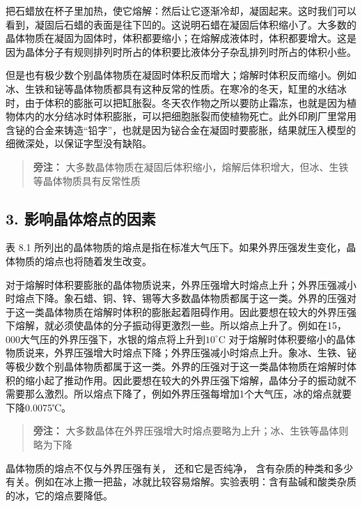 把石蜡放在杯子里加热，使它熔解：然后让它逐渐冷却，凝固起来。这时我们可以看到，凝固后石蜡的表面是往下凹的。这说明石蜡在凝固后体积缩小了。大多数的晶体物质在凝固为固体时，体积都要缩小；在熔解成液体时，体积都要增大。这是因为晶体分子有规则排列时所占的体积要比液体分子杂乱排列时所占的体积小些。

但是也有极少数个别晶体物质在凝固时体积反而增大；熔解时体积反而缩小。例如冰、生铁和铋等晶体物质都具有这种反常的性质。在寒冷的冬天，缸里的水结冰时，由于体积的膨胀可以把缸胀裂。冬天农作物之所以要防止霜冻，也就是因为植物体内的水分结冰时体积膨胀，可以把细胞胀裂而使植物死亡。此外印刷厂里常用含铋的合金来铸造``铅字''，也就是因为铋合金在凝固时要膨胀，结果就压入模型的细微深处，以保证字型没有缺陷。

\begin{quote}
\textbf{旁注：}
大多数晶体物质在凝固后体积缩小，熔解后体积增大，但冰、生铁等晶体物质具有反常性质
\end{quote}

\subsection{3.
影响晶体熔点的因素}\label{ux5f71ux54cdux6676ux4f53ux7194ux70b9ux7684ux56e0ux7d20}

表 8.1
所列出的晶体物质的熔点是指在标准大气压下。如果外界压强发生变化，晶体物质的熔点也将随着发生改变。

对于熔解时体积要膨胀的晶体物质说来，外界压强增大时熔点上升；外界压强减小时熔点下降。象石蜡、铜、锌、锡等大多数晶体物质都属于这一类。外界的压强对于这一类晶体物质在熔解时体积的膨胀起着阻碍作用。因此要想在较大的外界压强下熔解，就必须使晶体的分子振动得更激烈一些。所以熔点上升了。例如在15，000大气压的外界压强下，水银的熔点将上升到\(10^{\circ}\mathrm{C}\)
对于熔解时体积要缩小的晶体物质说来，外界压强增大时熔点下降；外界压强减小时熔点上升。象冰、生铁、铋等极少数个别晶体物质都属于这一类。外界的压强对于这一类晶体物质在熔解时体积的缩小起了推动作用。因此要想在较大的外界压强下熔解，晶体分子的振动就不需要那么激烈。所以熔点下降了，例如外界压强每增加1个大气压，冰的熔点就要下降0.0075℃。

\begin{quote}
\textbf{旁注：}
大多数晶体在外界压强增大时熔点要略为上升；冰、生铁等晶体则略为下降
\end{quote}

晶体物质的熔点不仅与外界压强有关， 还和它是否纯净，
含有杂质的种类和多少有关。例如在冰上撒一把盐，冰就比较容易熔解。实验表明：含有盐碱和酸类杂质的冰，它的熔点要降低。


